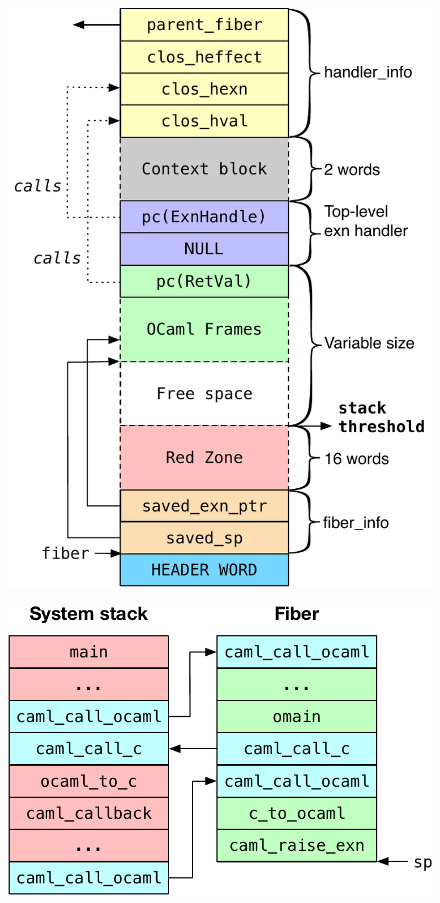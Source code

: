 \documentclass[sigplan,screen]{acmart}
\begin{document}
\begin{figure}
\begin{minipage}{0.35\linewidth}
  \centering
  \includegraphics[scale=0.45]{figures/fiber}
  \label{fig:fiber}
\end{minipage}
\begin{minipage}{0.64\linewidth}
  \begin{minipage}{\linewidth}
    \centering
    \includegraphics[scale=0.4]{figures/multicore_stack}

\end{minipage}
\end{minipage}
\end{figure}
\end{document}
